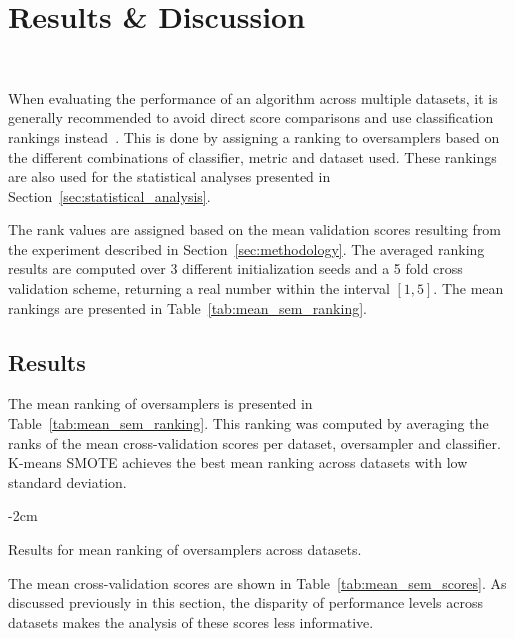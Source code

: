 \documentclass[preprint,12pt]{elsarticle}
\begin{document}
\section{Results \& Discussion}~\label{sec:results}

When evaluating the performance of an algorithm across multiple datasets, it
is generally recommended to avoid direct score comparisons and use
classification rankings instead~\cite{demvsar2006}. This is done by assigning
a ranking to oversamplers based on the different combinations of classifier,
metric and dataset used. These rankings are also used for the statistical
analyses presented in Section~\ref{sec:statistical_analysis}.

The rank values are assigned based on the mean validation scores resulting
from the experiment described in Section~\ref{sec:methodology}. The averaged
ranking results are computed over 3 different initialization seeds and a 5
fold cross validation scheme, returning a real number within the interval
$[1,5]$. The mean rankings are presented in Table~\ref{tab:mean_sem_ranking}.

\subsection{Results}

The mean ranking of oversamplers is presented in
Table~\ref{tab:mean_sem_ranking}. This ranking was computed by averaging the
ranks of the mean cross-validation scores per dataset, oversampler and
classifier. K-means SMOTE achieves the best mean ranking across datasets with
low standard deviation.

\begin{table}
	\centering
    \addtolength{\leftskip} {-2cm}
    \addtolength{\rightskip}{-2cm}
    \captionsetup{justification=centering}
    \caption{
        Results for mean ranking of oversamplers across datasets.
    }\label{tab:mean_sem_ranking}
\end{table}

The mean cross-validation scores are shown in Table~\ref{tab:mean_sem_scores}.
As discussed previously in this section, the disparity of performance levels
across datasets makes the analysis of these scores less informative.
\end{document}
